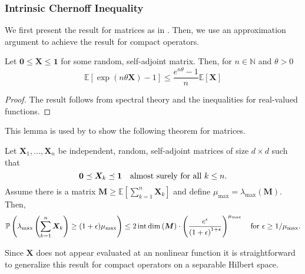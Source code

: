 \subsubsection{Intrinsic Chernoff Inequality}
We first present the result for matrices as in \cite{tropp2015introduction}. Then, we use an approximation argument to achieve the result for compact operators.



\begin{thm}
      Let \( \bm{0} \leq \bm{X} \leq \bm{1} \) for some random, self-adjoint matrix. Then, for \( n \in \mathbb{N} \) and \( \theta >0 \)
      \[ \mathbb{E}\left[\operatorname{exp}\left(n\theta \bm{X}\right)-1\right] \leq \frac{e^{n\theta}-1}{n} \mathbb{E}\left[\bm{X}\right]\]
\end{thm}

\begin{proof}
    The result follows from spectral theory and the inequalities for real-valued functions.
\end{proof}


This lemma is used by \cite{tropp2015introduction} to show the following theorem for matrices.
\begin{thm}
    Let \( \bm{X}_1,\dots, \bm{X}_n \) be independent, random, self-adjoint matrices of size \(  d \times d \) such that 
    \[ \bm{0} \preceq\bm{X}_k \preceq\bm{1} \quad \text{almost surely for all \( k \leq n \)}.\]
    Assume there is a matrix \( \bm{M} \geq \mathbb{E}\left[\sum_{k=1}^{n}\bm{X}_k\right] \) and define \( \mu_{\text{max}}= \lambda_{\text{max}}\left(\bm{M}\right) \). Then,
    \[ \mathbb{P}\left(\lambda_{\text{max}} \left(\sum_{k=1}^{n}\bm{X}_k\right) \geq (1+\epsilon)\mu_{\text{max}}\right) \leq 2\operatorname{int\, dim}\left(\bm{M}\right) \cdot \left(\frac{e^{\epsilon}}{\left(1+\epsilon\right)^{1+\epsilon}}\right)^{\mu_{\text{max}}} \quad \text{for \( \epsilon \geq 1/\mu_{\text{max}} \)}.\]
\end{thm}

Since \( \bm{X} \) does not appear evaluated at an nonlinear function it is straightforward to generalize this result for compact operators on a separable Hilbert space. 

